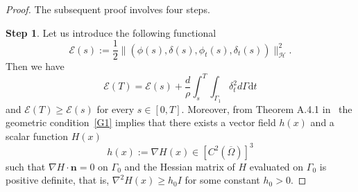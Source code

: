 \documentclass[10pt]{elsarticle}
\begin{document}
\begin{proof}
The subsequent proof involves four steps.

\textbf{Step 1}. 
Let us introduce the following functional
\[
\mathcal{E}(s) := \frac{1}{2}\|( \phi(s), \delta(s), \phi_t(s), \delta_t(s))\|^2_{\mathcal{H}}.
\]
Then we have
\[
\mathcal{E}(T)=\mathcal{E}(s)+\frac{d}{\rho}\int_{s}^{T}\int_{\Gamma_1}\delta_{t}^2d\Gamma \mathrm{d}t
\]
and $\mathcal{E}(T)\geqslant \mathcal{E}(s)$ for every $s\in[0, T]$.
Moreover, from Theorem A.4.1 in~\cite{LTZ} the geometric condition~\eqref{G1} implies that there exists a vector field $h(x)$ and a scalar function $H(x)$
\[
	h(x):=\nabla H(x) \in[C^2(\overline{\Omega})]^3
\]
such that $\nabla H\cdot\mathbf{n}=0$ on $\Gamma_0$ and the Hessian matrix of $H$ evaluated on $\Gamma_0$ is positive definite, that is, $\nabla^2 H(x) \geqslant h_0 I$ for some constant $h_0 > 0$.


\end{proof}
\end{document}
